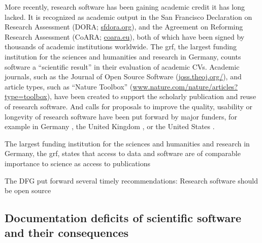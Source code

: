 More recently, research software has been gaining academic credit it has long lacked.
It is recognized as academic output in the San Francisco Declaration on Research Assessment (DORA; \href{https://sfdora.org/}{sfdora.org}), and the Agreement on Reforming Research Assessment (CoARA; \href{https://coara.eu}{coara.eu}), both of which have been signed by thousands of academic institutions worldwide. The \gls{grf}, the largest funding institution for the sciences and humanities and research in Germany, counts software a ``scientific result'' in their evaluation of academic CVs.
Academic journals, such as the Journal of Open Source Software (\href{https://joss.theoj.org/}{joss.theoj.org/}), and article types, such as ``Nature Toolbox'' (\href{https://www.nature.com/nature/articles?type=toolbox}{www.nature.com/nature/articles?type=toolbox}), have been created to support the scholarly publication and reuse of research software.
And calls for proposals to improve the quality, usability or longevity of research software have been put forward by major funders, for example in Germany \citep{dfgrs}, the United Kingdom \citep{ukri}, or the United States \citep{nih}.



The largest funding institution for the sciences and humanities and research in Germany, the \gls{grf}, states that access to data and software are of comparable importance to science as access to publications \citep{dfg}

The DFG put forward several timely recommendations: Research software should be open source \citep{dfg}


\subsection{Documentation deficits of scientific software and their consequences}


